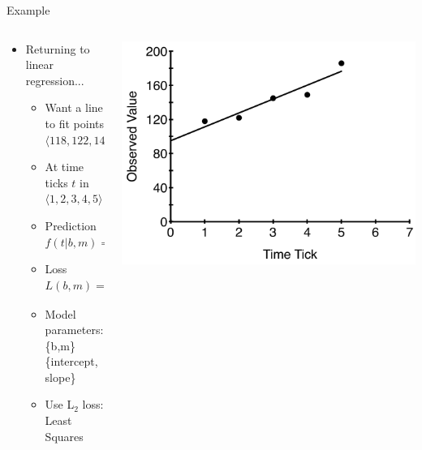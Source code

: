 \documentclass[aspectratio=169]{beamer}
\begin{document}
\begin{frame}{Example}

\begin{columns}[T]
\begin{column}{0.5\textwidth}
\begin{itemize}
\item Returning to linear regression...
	\begin{itemize}
	\item Want a line to fit points $\langle 118, 122, 145, 149, 186 \rangle$ 
	\item At time ticks 
		$t$ in $\langle 1, 2, 3, 4, 5 \rangle$
	\item Prediction $f(t | b, m) = b + m \times t$
	\item Loss $L(b, m) = \sum_i \left(f(t_i | b, m) - x_i \right)^2$
	\item Model parameters: \{b,m\}  \{intercept, slope\} %
	\item Use L$_2$ loss: Least Squares
	\end{itemize}
\end{itemize}
\end{column}
\begin{column}{0.5\textwidth}
\includegraphics[width=1\textwidth]{lectGD/gdLR1fit.pdf}
\end{column}
\end{columns}

\end{frame}
\end{document}
